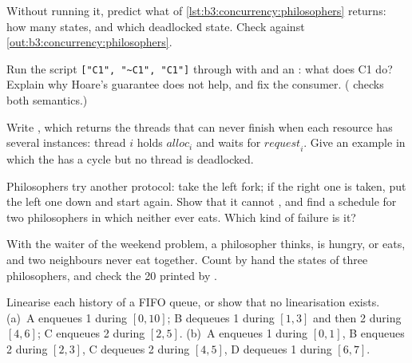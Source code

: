 \begin{exercise}[$\star$]\label{exo:b3:concurrency:4}
Without running it, predict what  of \cref{lst:b3:concurrency:philosophers} returns: how many states, and which deadlocked state. Check against \cref{out:b3:concurrency:philosophers}.
\end{exercise}

\begin{exercise}[$\star\star$]\label{exo:b3:concurrency:5}
Run the script \texttt{["C1", "\textasciitilde C1", "C1"]} through  with  and an : what does C1 do? Explain why Hoare's guarantee does not help, and fix the consumer. ( checks both semantics.)
\end{exercise}

\begin{exercise}[$\star\star$]\label{exo:b3:concurrency:6}
Write , which returns the threads that can never finish when each resource has several instances: thread $i$ holds $\mathit{alloc}_i$ and waits for $\mathit{request}_i$. Give an example in which the  has a cycle but no thread is deadlocked.
\end{exercise}

\begin{exercise}[$\star\star$]\label{exo:b3:concurrency:7}
Philosophers try another protocol: take the left fork; if the right one is taken, put the left one down and start again. Show that it cannot , and find a schedule for two philosophers in which neither ever eats. Which kind of failure is it?
\end{exercise}

\begin{exercise}[$\star\star$]\label{exo:b3:concurrency:8}
With the waiter of the weekend problem, a philosopher thinks, is hungry, or eats, and two neighbours never eat together. Count by hand the states of three philosophers, and check the 20 printed by .
\end{exercise}

\begin{exercise}[$\star\star$]\label{exo:b3:concurrency:9}
Linearise each history of a FIFO queue, or show that no linearisation exists. (a)~A enqueues 1 during $[0, 10]$; B dequeues 1 during $[1, 3]$ and then 2 during $[4, 6]$; C enqueues 2 during $[2, 5]$. (b)~A enqueues 1 during $[0, 1]$, B enqueues 2 during $[2, 3]$, C dequeues 2 during $[4, 5]$, D dequeues 1 during $[6, 7]$.
\end{exercise}

